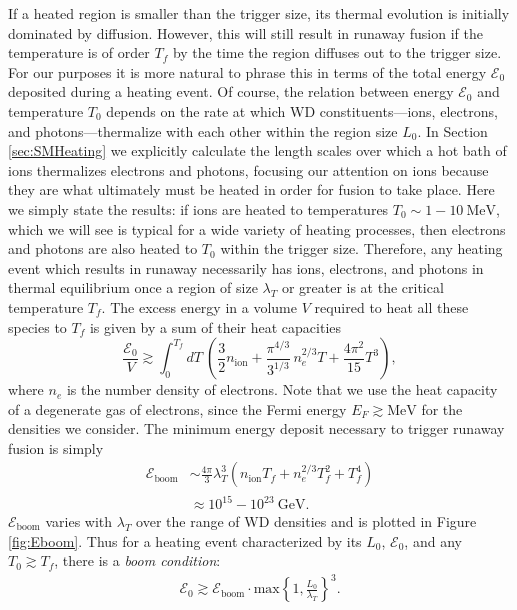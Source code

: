 \documentclass[twocolumn, preprintnumbers,amsmath,amssymb,prd, superscriptaddress]{revtex4}
\newcommand{\Ez}{\mathcal{E}_0}
\newcommand{\Eboom}{\mathcal{E}_\text{boom}}
\newcommand{\GeV}{\text{GeV}}
\newcommand{\MeV}{\text{MeV}}
\begin{document}
If a heated region is smaller than the trigger size, its thermal evolution is initially dominated by diffusion.
However, this will still result in runaway fusion if the temperature is of order $T_f$ by the time the region diffuses out to the trigger size.
For our purposes it is more natural to phrase this in terms of the total energy $\Ez$ deposited during a heating event.
Of course, the relation between energy $\Ez$ and temperature $T_0$ depends on the rate at which WD constituents---ions, electrons, and photons---thermalize with each other within the region size $L_0$.
In Section \ref{sec:SMHeating} we explicitly calculate the length scales over which a hot bath of ions thermalizes electrons and photons, focusing our attention on ions because they are what ultimately must be heated in order for fusion to take place.
Here we simply state the results: if ions are heated to temperatures $T_0 \sim 1 - 10 ~\MeV$, which we will see is typical for a wide variety of heating processes, then electrons and photons are also heated to $T_0$ within the trigger size.
Therefore, any heating event which results in runaway necessarily has ions, electrons, and photons in thermal equilibrium once a region of size $\lambda_T$ or greater is at the critical temperature $T_f$.
The excess energy in a volume $V$ required to heat all these species to $T_f$ is given by a sum of their heat capacities
\begin{equation}
\label{eq:heatcapacity}
  \frac{\Ez}{V} \gtrsim \int_0^{T_f} dT ~\left(\frac32 n_\text{ion} + \frac{\pi^{4/3}}{3^{1/3}}\, n_e^{2/3} T + \frac{4 \pi^2}{15} T^3 \right),
\end{equation}
where $n_e$ is the number density of electrons.
Note that we use the heat capacity of a degenerate gas of electrons, since the Fermi energy $E_F \gtrsim \MeV$ for the densities we consider.
The minimum energy deposit necessary to trigger runaway fusion is simply
\begin{align}
\label{eq:Eboom}
\Eboom &\sim \frac{4 \pi}{3} \lambda_T^3 (n_\text{ion} T_f + n_e^{2/3} T_f^2 + T_f^4) \\
         &\approx 10^{15} - 10^{23} ~\GeV \nonumber.
\end{align}
$\Eboom$ varies with $\lambda_T$ over the range of WD densities and is plotted in Figure \ref{fig:Eboom}.
Thus for a heating event characterized by its $L_0$, $\Ez$, and any $T_0 \gtrsim T_f$, there is a \emph{boom condition}:
\begin{align}
    \label{eq:energy_boom_condition}
    \Ez \gtrsim
    \Eboom \cdot \text{max}\left\{1, \frac{L_0}{\lambda_T}\right\}^3.
\end{align}
\end{document}
